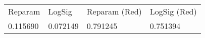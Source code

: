 \begin{tabular}{llll}
\toprule
\midrule
Reparam & LogSig & Reparam (Red) & LogSig (Red) \\
0.115690 & 0.072149 & 0.791245 & 0.751394 \\
\bottomrule
\end{tabular}
